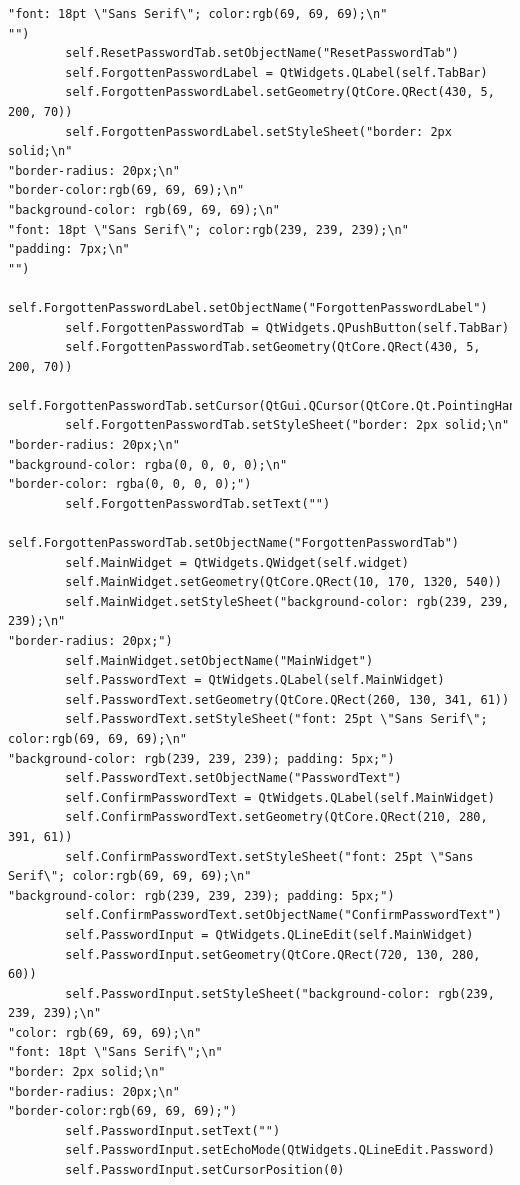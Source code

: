 \documentclass{article}
\begin{document}
\begin{lstlisting}
"font: 18pt \"Sans Serif\"; color:rgb(69, 69, 69);\n"
"")
        self.ResetPasswordTab.setObjectName("ResetPasswordTab")
        self.ForgottenPasswordLabel = QtWidgets.QLabel(self.TabBar)
        self.ForgottenPasswordLabel.setGeometry(QtCore.QRect(430, 5, 200, 70))
        self.ForgottenPasswordLabel.setStyleSheet("border: 2px solid;\n"
"border-radius: 20px;\n"
"border-color:rgb(69, 69, 69);\n"
"background-color: rgb(69, 69, 69);\n"
"font: 18pt \"Sans Serif\"; color:rgb(239, 239, 239);\n"
"padding: 7px;\n"
"")
        self.ForgottenPasswordLabel.setObjectName("ForgottenPasswordLabel")
        self.ForgottenPasswordTab = QtWidgets.QPushButton(self.TabBar)
        self.ForgottenPasswordTab.setGeometry(QtCore.QRect(430, 5, 200, 70))
        self.ForgottenPasswordTab.setCursor(QtGui.QCursor(QtCore.Qt.PointingHandCursor))
        self.ForgottenPasswordTab.setStyleSheet("border: 2px solid;\n"
"border-radius: 20px;\n"
"background-color: rgba(0, 0, 0, 0);\n"
"border-color: rgba(0, 0, 0, 0);")
        self.ForgottenPasswordTab.setText("")
        self.ForgottenPasswordTab.setObjectName("ForgottenPasswordTab")
        self.MainWidget = QtWidgets.QWidget(self.widget)
        self.MainWidget.setGeometry(QtCore.QRect(10, 170, 1320, 540))
        self.MainWidget.setStyleSheet("background-color: rgb(239, 239, 239);\n"
"border-radius: 20px;")
        self.MainWidget.setObjectName("MainWidget")
        self.PasswordText = QtWidgets.QLabel(self.MainWidget)
        self.PasswordText.setGeometry(QtCore.QRect(260, 130, 341, 61))
        self.PasswordText.setStyleSheet("font: 25pt \"Sans Serif\"; color:rgb(69, 69, 69);\n"
"background-color: rgb(239, 239, 239); padding: 5px;")
        self.PasswordText.setObjectName("PasswordText")
        self.ConfirmPasswordText = QtWidgets.QLabel(self.MainWidget)
        self.ConfirmPasswordText.setGeometry(QtCore.QRect(210, 280, 391, 61))
        self.ConfirmPasswordText.setStyleSheet("font: 25pt \"Sans Serif\"; color:rgb(69, 69, 69);\n"
"background-color: rgb(239, 239, 239); padding: 5px;")
        self.ConfirmPasswordText.setObjectName("ConfirmPasswordText")
        self.PasswordInput = QtWidgets.QLineEdit(self.MainWidget)
        self.PasswordInput.setGeometry(QtCore.QRect(720, 130, 280, 60))
        self.PasswordInput.setStyleSheet("background-color: rgb(239, 239, 239);\n"
"color: rgb(69, 69, 69);\n"
"font: 18pt \"Sans Serif\";\n"
"border: 2px solid;\n"
"border-radius: 20px;\n"
"border-color:rgb(69, 69, 69);")
        self.PasswordInput.setText("")
        self.PasswordInput.setEchoMode(QtWidgets.QLineEdit.Password)
        self.PasswordInput.setCursorPosition(0)

\end{lstlisting}
\end{document}
